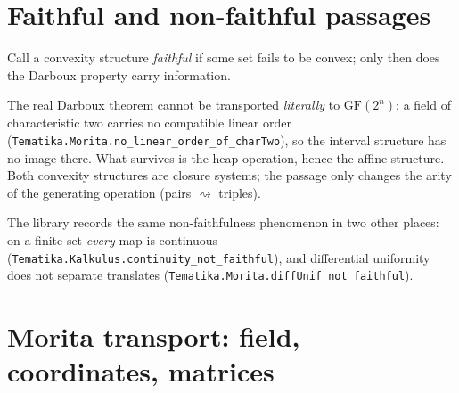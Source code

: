\documentclass[11pt]{article}
\newcommand{\FF}{\mathbb{F}}
\newcommand{\RR}{\mathbb{R}}
\newcommand{\lean}[1]{\texttt{\small #1}}
\theoremstyle{definition}
\theoremstyle{plain}
\begin{document}
\section{Faithful and non-faithful passages}

Call a convexity structure \emph{faithful} if some set fails to be convex; only then does
the Darboux property carry information.

\begin{center}
\end{center}

The real Darboux theorem cannot be transported \emph{literally} to $\mathrm{GF}(2^n)$: a
field of characteristic two carries no compatible linear order
(\lean{Tematika.Morita.no\_linear\_order\_of\_charTwo}), so the interval structure has no
image there.  What survives is the heap operation, hence the affine structure.  Both
convexity structures are closure systems; the passage only changes the arity of the
generating operation (pairs $\rightsquigarrow$ triples).

The library records the same non-faithfulness phenomenon in two other places: on a finite
set \emph{every} map is continuous (\lean{Tematika.Kalkulus.continuity\_not\_faithful}), and
differential uniformity does not separate translates
(\lean{Tematika.Morita.diffUnif\_not\_faithful}).

\section{Morita transport: field, coordinates, matrices}
\end{document}
